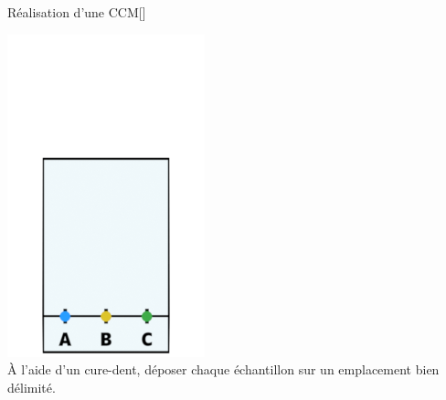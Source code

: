 \begin{doc}{Réalisation d'une CCM}[\label{doc:protocole_CCM}]
\begin{multicols}{3}
    \begin{center}
      \includegraphics[height=0.2\textheight]{images/chimie/CCM/CCM_protocole0003.png} \\      
      À l'aide d'un cure-dent, déposer chaque échantillon sur un emplacement bien délimité.
    \end{center}
  \end{multicols}
  
  \bigskip
  

\end{doc}

